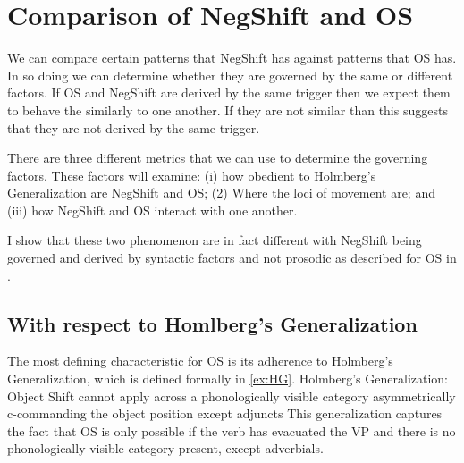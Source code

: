 \documentclass[12pt, letterpaper]{article}
\begin{document}
\section{Comparison of NegShift and OS} \label{sec:NEG-OS}
We can compare certain patterns that NegShift has against patterns that OS has. In so doing we can determine whether they are governed by the same or different factors. If OS and NegShift are derived by the same trigger then we expect them to behave the similarly to one another. If they are not similar than this suggests that they are not derived by the same trigger. 

There are three different metrics that we can use to determine the governing factors. These factors will examine: (i) how obedient to Holmberg's Generalization are NegShift and OS; (2) Where the loci of movement are; and (iii) how NegShift and OS interact with one another.   

I show that these two phenomenon are in fact different with NegShift being governed and derived by syntactic factors and not prosodic as described for OS in \citet{erteschik-shirSoundPatternsSyntax2005,erteschik-shirScandinavianObjectShift2017,erteschik-shirVariationMainlandScandinavian2020,brinkerhoffMATCHINGPhrasesNorwegian2021}.  

\subsection{With respect to Homlberg's Generalization} \label{sec:HG}

The most defining characteristic for OS is its adherence to Holmberg's Generalization, which is defined formally in \ref{ex:HG}.  
\ea \label{ex:HG} {Holmberg's Generalization:\\
Object Shift cannot apply across a phonologically visible category asymmetrically c-commanding the object position except adjuncts} 
\z
This generalization captures the fact that OS is only possible if the verb has evacuated the VP and there is no phonologically visible category present, except adverbials. 
\end{document}
